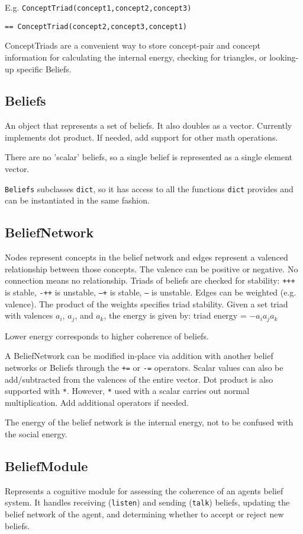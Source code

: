 \documentclass[11pt, a4paper]{article}
\begin{document}
E.g. \texttt{ConceptTriad(concept1,concept2,concept3)} 

\texttt{== ConceptTriad(concept2,concept3,concept1)}

ConceptTriads are a convenient way to store concept-pair and concept information for calculating the internal energy, checking for triangles, or looking-up specific Beliefs.

\subsection{Beliefs}

An object that represents a set of beliefs. It also doubles as a vector. Currently implements dot product. If needed, add support for other math operations.

There are no 'scalar' beliefs, so a single belief is represented as a single element vector.

\texttt{Beliefs} subclasses \texttt{dict}, so it has access to all the functions \texttt{dict} provides and can be instantiated in the same fashion.

\subsection{BeliefNetwork}
Nodes represent concepts in the belief network and edges represent a valenced relationship between those concepts. The valence can be positive or negative. No connection means no relationship. Triads of beliefs are checked for stability:
\texttt{+++} is stable,
\texttt{-++} is unstable,
\texttt{--+} is stable,
\texttt{---} is unstable.
Edges can be weighted (e.g. valence). The product of the weights specifies triad stability. Given a set triad with valences $a_i$, $a_j$, and $a_k$, the energy is given by: triad energy = $- a_i  a_j  a_k$

Lower energy corresponds to higher coherence of beliefs.

A BeliefNetwork can be modified in-place via addition with another belief networks or Beliefs through the \texttt{+=} or \texttt{-=} operators. Scalar values can also be add/subtracted from the valences of the entire vector. Dot product is also supported with \texttt{*}. However, \texttt{*} used with a scalar carries out normal multiplication. Add additional operators if needed.

The energy of the belief network is the internal energy, not to be confused with the social energy.

\subsection{BeliefModule}
Represents a cognitive module for assessing the coherence of an agents belief system. It handles receiving (\texttt{listen}) and sending (\texttt{talk}) beliefs, updating the belief network of the agent, and determining whether to  accept or reject new beliefs.
\end{document}
